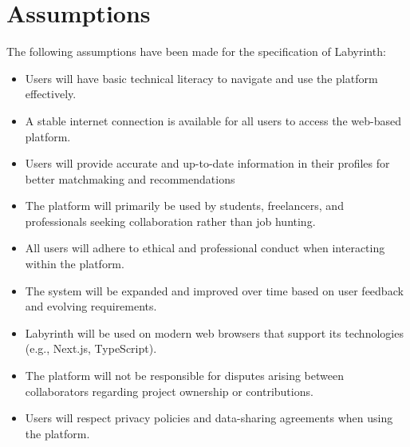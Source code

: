 \documentclass{FastFyp}
\begin{document}
\section{Assumptions}
The following assumptions have been made for the specification of Labyrinth:
\begin{itemize}
    \item Users will have basic technical literacy to navigate and use the platform effectively.
    \item A stable internet connection is available for all users to access the web-based platform.
    \item Users will provide accurate and up-to-date information in their profiles for better matchmaking and recommendations
    \item The platform will primarily be used by students, freelancers, and professionals seeking collaboration rather than job hunting.
    \item All users will adhere to ethical and professional conduct when interacting within the platform.
    \item The system will be expanded and improved over time based on user feedback and evolving requirements.
    \item Labyrinth will be used on modern web browsers that support its technologies (e.g., Next.js, TypeScript).
    \item The platform will not be responsible for disputes arising between collaborators regarding project ownership or contributions. 
    \item Users will respect privacy policies and data-sharing agreements when using the platform.
    
\end{itemize}

\end{document}
